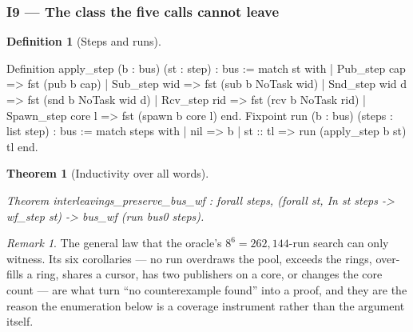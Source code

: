 \documentclass[10pt,journal,compsoc,twocolumn]{article}
\newtheorem{theorem}{Theorem}[section]
\theoremstyle{definition}
\newtheorem{definition}{Definition}[section]
\theoremstyle{remark}
\newtheorem{remark}{Remark}[section]
\theoremstyle{plain}
\begin{document}
\subsubsection*{I9 --- The class the five calls cannot leave}
\begin{definition}[Steps and runs]
\begin{coc}
Definition apply_step (b : bus) (st : step) : bus :=
  match st with
  | Pub_step cap       => fst (pub b cap)
  | Sub_step wid       => fst (sub b NoTask wid)
  | Snd_step wid d     => fst (snd b NoTask wid d)
  | Rcv_step rid       => fst (rcv b NoTask rid)
  | Spawn_step core l  => fst (spawn b core l)
  end.
Fixpoint run (b : bus) (steps : list step) : bus :=
  match steps with
  | nil      => b
  | st :: tl => run (apply_step b st) tl
  end.
\end{coc}\end{definition}
\begin{theorem}[Inductivity over all words]
\begin{coc}
Theorem interleavings_preserve_bus_wf : forall steps,
  (forall st, In st steps -> wf_step st) -> bus_wf (run bus0 steps).
\end{coc}\end{theorem}
\begin{remark}
The general law that the oracle's \(8^{6}=262{,}144\)-run search can only
witness. Its six corollaries --- no run overdraws the pool, exceeds the rings,
over-fills a ring, shares a cursor, has two publishers on a core, or changes the
core count --- are what turn ``no counterexample found'' into a proof, and they
are the reason the enumeration below is a coverage instrument rather than the
argument itself.
\end{remark}
\end{document}
